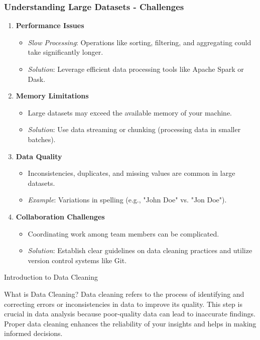 \documentclass[aspectratio=169]{beamer}
\begin{document}
\begin{frame}[fragile]
    \frametitle{Understanding Large Datasets - Challenges}
    \begin{enumerate}
        \item \textbf{Performance Issues}
            \begin{itemize}
                \item \textit{Slow Processing}: Operations like sorting, filtering, and aggregating could take significantly longer.
                \item \textit{Solution}: Leverage efficient data processing tools like Apache Spark or Dask.
            \end{itemize}
        \item \textbf{Memory Limitations}
            \begin{itemize}
                \item Large datasets may exceed the available memory of your machine.
                \item \textit{Solution}: Use data streaming or chunking (processing data in smaller batches).
            \end{itemize}
        \item \textbf{Data Quality}
            \begin{itemize}
                \item Inconsistencies, duplicates, and missing values are common in large datasets.
                \item \textit{Example}: Variations in spelling (e.g., "John Doe" vs. "Jon Doe").
            \end{itemize}
        \item \textbf{Collaboration Challenges}
            \begin{itemize}
                \item Coordinating work among team members can be complicated.
                \item \textit{Solution}: Establish clear guidelines on data cleaning practices and utilize version control systems like Git.
            \end{itemize}
    \end{enumerate}
\end{frame}

\begin{frame}[fragile]{Introduction to Data Cleaning}
    \begin{block}{What is Data Cleaning?}
        Data cleaning refers to the process of identifying and correcting errors or inconsistencies in data to improve its quality. This step is crucial in data analysis because poor-quality data can lead to inaccurate findings. Proper data cleaning enhances the reliability of your insights and helps in making informed decisions.
    \end{block}
\end{frame}
\end{document}
